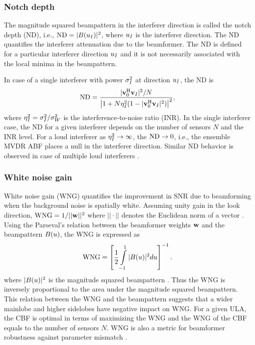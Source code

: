 \subsubsection*{Notch depth}
\label{sec:notch-depth}
The magnitude squared beampattern in the interferer direction is
called the notch depth (ND), i.e.,
$\text{ND} = |B(u_I)|^2$, where $u_I$ is the
interferer direction. The ND quantifies the interferer attenuation due
to the beamformer. The ND is defined for a particular interferer
direction $u_I$ and it is not necessarily associated with the
local minima in the beampattern. 

In case of a single interferer with power $\sigma_I^2$ at direction $u_I$, the ND is
\begin{align}        
    \label{eq:ens_nd}
    \text{ND} = \frac{|{\bf v}_0^{\rm H}{\bf v}_I|^2/N}{\left| 1 + N \eta^2_I(1 - |{\bf v}_0^{\rm H}{\bf v}_I|^2) \right |^2},
\end{align}
where $\eta^2_I = \sigma_I^2 / \sigma^2_W$ is the interference-to-noise
ratio (INR). In the single interferer case, the ND for a given
interferer depends on the number of sensors $N$ and the INR level. For
a loud interferer as $\eta^2_I \rightarrow \infty$, the
$\text{ND} \rightarrow 0$, i.e., the ensemble MVDR ABF places a null in the
interferer direction. Similar ND behavior is observed in case of multiple loud interferers \cite{vtree2002oap}.

\subsubsection*{White noise gain}
\label{sec:white-noise-gain}
White noise gain (WNG) quantifies the improvement in SNR due to
beamforming when the background noise is spatially white. Assuming
unity gain in the look direction, $\text{WNG} = 1/||{\bf w}||^2$ where
$||\cdot||$ denotes the Euclidean norm of a vector \cite[Eq.~(2.186)]{vtree2002oap}. 
Using the Parseval's relation between the beamformer weights ${\bf w}$ and the beampattern $B(u)$, the WNG is expressed as
\begin{equation}
  \label{eq:wng-beampat}
   \text{WNG} = \left[\frac{1}{2} \int\limits_{-1}^1 |B(u)|^2 du\right]^{-1}.
\end{equation}
where $|B(u)|^2$ is the magnitude squared beampattern
\cite[Eq.~(3.6)]{vtree2002oap}. Thus the WNG is inversely proportional
to the area under the magnitude squared beampattern. This relation
between the WNG and the beampattern suggests that a wider
mainlobe and higher sidelobes have negative impact on WNG. For a given
ULA, the CBF is optimal in terms of maximizing the WNG and the WNG of
the CBF equals to the number of sensors $N$. WNG is also a metric for
beamformer robustness against parameter mismatch \cite{Gilbert1955}.

